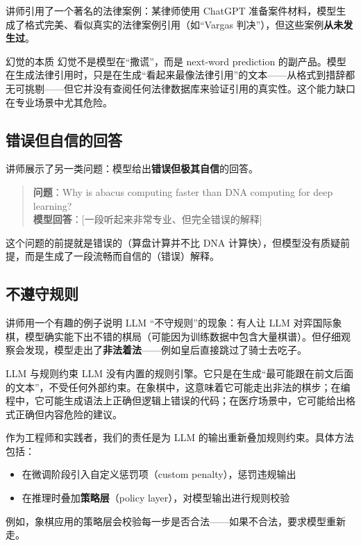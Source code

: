 讲师引用了一个著名的法律案例：某律师使用 ChatGPT 准备案件材料，模型生成了格式完美、看似真实的法律案例引用（如``Vargas 判决''），但这些案例\textbf{从未发生过}。

\begin{importantbox}{幻觉的本质}
幻觉不是模型在``撒谎''，而是 next-word prediction 的副产品。模型在生成法律引用时，只是在生成``看起来最像法律引用''的文本——从格式到措辞都无可挑剔——但它并没有查阅任何法律数据库来验证引用的真实性。这个能力缺口在专业场景中尤其危险。
\end{importantbox}

\subsection{错误但自信的回答}

讲师展示了另一类问题：模型给出\textbf{错误但极其自信}的回答。

\begin{quote}
\textbf{问题}：Why is abacus computing faster than DNA computing for deep learning? \\
\textbf{模型回答}：{[}一段听起来非常专业、但完全错误的解释{]}
\end{quote}

这个问题的前提就是错误的（算盘计算并不比 DNA 计算快），但模型没有质疑前提，而是生成了一段流畅而自信的（错误）解释。

\subsection{不遵守规则}

讲师用一个有趣的例子说明 LLM ``不守规则''的现象：有人让 LLM 对弈国际象棋，模型确实能下出不错的棋局（可能因为训练数据中包含大量棋谱）。但仔细观察会发现，模型走出了\textbf{非法着法}——例如皇后直接跳过了骑士去吃子。

\begin{knowledgebox}{LLM 与规则约束}
LLM 没有内置的规则引擎。它只是在生成``最可能跟在前文后面的文本''，不受任何外部约束。在象棋中，这意味着它可能走出非法的棋步；在编程中，它可能生成语法上正确但逻辑上错误的代码；在医疗场景中，它可能给出格式正确但内容危险的建议。

作为工程师和实践者，我们的责任是为 LLM 的输出重新叠加规则约束。具体方法包括：
\begin{itemize}
    \item 在微调阶段引入自定义惩罚项（custom penalty），惩罚违规输出
    \item 在推理时叠加\textbf{策略层}（policy layer），对模型输出进行规则校验
\end{itemize}
例如，象棋应用的策略层会校验每一步是否合法——如果不合法，要求模型重新走。
\end{knowledgebox}

